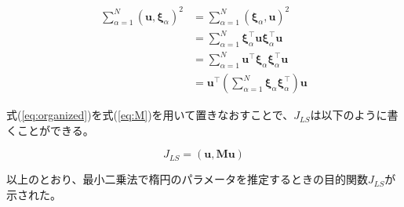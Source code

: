 \documentclass[12pt,a4j]{jsarticle}
\newcommand{\xia}{\bm{\xi}_\alpha}
\begin{document}
  \begin{align}
    \sum_{\alpha = 1}^N (\bm{u}, \xia)^2 &= \sum_{\alpha = 1}^N (\xia, \bm{u})^2 \nonumber \\
     &= \sum_{\alpha = 1}^N \xia^\top \bm{u} \xia^\top \bm{u} \nonumber \\
     &= \sum_{\alpha = 1}^N \bm{u}^\top \xia \xia^\top \bm{u} \nonumber \\
     &= \bm{u}^\top \left(\sum_{\alpha = 1}^N \xia \xia^\top \right) \bm{u} \label{eq:organized}
  \end{align}

  式(\ref{eq:organized})を式(\ref{eq:M})を用いて置きなおすことで、$J_{LS}$は以下のように書くことができる。

  \begin{equation}
    J_{LS} = (\bm{u}, \bm{Mu})
  \end{equation}

  以上のとおり、最小二乗法で楕円のパラメータを推定するときの目的関数$J_{LS}$が示された。
\end{document}
